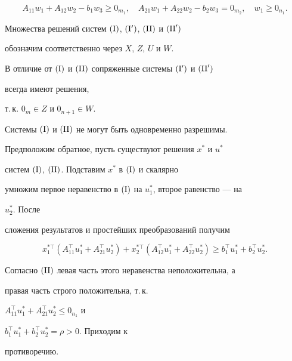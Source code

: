\begin{equation}


A_{11}w_1+A_{12}w_2-b_1w_3\ge0_{m_1},\quad


A_{21}w_1+A_{22}w_2-b_2w_3=0_{m_2},\quad


w_1\ge0_{n_1}.\tag{$\II '$}


\end{equation}





Множества решений систем $(\mathrm I)$, $(\mathrm I ')$, $(\mathrm{II})$ и $(\mathrm{II} ')$


обозначим соответственно через $X$, $Z$, $U$ и $W$.


В отличие от $(\mathrm I)$ и $(\mathrm{II})$ сопряженные системы $(\mathrm I ')$ и $(\mathrm{II} ')$ 


всегда имеют решения,


т.\,к. $0_m\in Z$ и $0_{n+1}\in W$.





\begin{lemnonum}


Системы $(\mathrm I)$ и $(\mathrm{II})$ не могут быть одновременно разрешимы.


\end{lemnonum}





\begin{pf}


Предположим обратное, пусть существуют решения $x^*$ и $u^*$


систем $(\mathrm I)$, $(\mathrm{II})$. Подставим $x^*$ в $(\mathrm I)$ и скалярно


умножим первое неравенство в $(\mathrm I)$ на $u^*_1$, второе равенство --- на 


$u^*_2$. После


сложения результатов и простейших преобразований получим


$$


x^{*\top}_1(A^\top_{11}u^*_1+A^\top_{21}u^*_2)+


x^{*\top}_2(A^\top_{12}u^*_1+A^\top_{22}u^*_2)\ge


b^\top_1u^*_1+b^\top_2u^*_2.


$$


Согласно $(\mathrm{II})$ левая часть этого неравенства неположительна, а


правая часть строго положительна, т.\,к. 


$A^\top_{11}u^*_1+A^\top_{21}u^*_2\le0_{n_1}$ и 


$b^\top_1u^*_1+b^\top_2u^*_2=\rho>0$. Приходим к


противоречию.


\end{pf}





